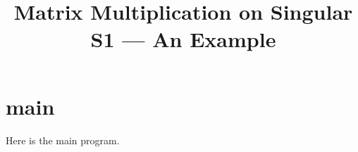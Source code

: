 \documentclass[10pt]{article}
\title{Matrix Multiplication on Singular S1 --- An Example}
\begin{document}
\maketitle

\section{main}

Here is the main program.  

\inputminted{c}{mm-main.c}
\end{document}
